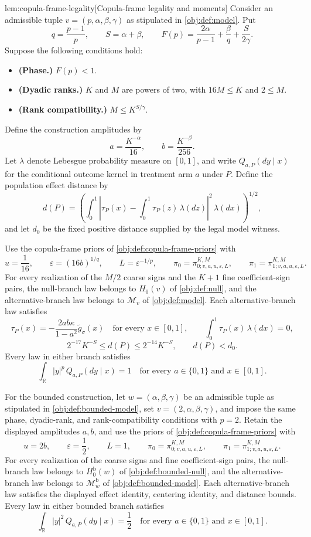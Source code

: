 \begin{lemmav}{lem:copula-frame-legality}[Copula-frame legality and moments]
Consider an admissible tuple \(v=(p,\alpha,\beta,\gamma)\) as stipulated in \cref{obj:def:model}. Put
\[
q=\frac{p-1}{p},\qquad S=\alpha+\beta,\qquad
F(p)=\frac{2\alpha}{p-1}+\frac{\beta}{q}+\frac{S}{2\gamma}.
\]
Suppose the following conditions hold:
\begin{itemize}
\item \textbf{(Phase.)} \(F(p)<1\).
\item \textbf{(Dyadic ranks.)} \(K\) and \(M\) are powers of two, with \(16M\le K\) and \(2\le M\).
\item \textbf{(Rank compatibility.)} \(M\le K^{S/\gamma}\).
\end{itemize}
Define the construction amplitudes by
\[
a=\frac{K^{-\alpha}}{16},\qquad b=\frac{K^{-\beta}}{256}.
\]
Let \(\lambda\) denote Lebesgue probability measure on \([0,1]\), and write \(Q_{a,P}(dy\mid x)\) for the conditional outcome kernel in treatment arm \(a\) under \(P\). Define the population effect distance by
\[
d(P)=
\left(
\int_0^1
\left|\tau_P(x)-\int_0^1\tau_P(z)\,\lambda(dz)\right|^2
\,\lambda(dx)
\right)^{1/2},
\]
and let \(d_0\) be the fixed positive distance supplied by the legal model witness.

Use the copula-frame priors of \cref{obj:def:copula-frame-priors} with
\[
u=\frac1{16},\qquad
\varepsilon=(16b)^{1/q},\qquad L=\varepsilon^{-1/p},
\qquad
\pi_0=\pi^{K,M}_{0;v,a,u,\varepsilon,L},\qquad
\pi_1=\pi^{K,M}_{1;v,a,u,\varepsilon,L}.
\]
For every realization of the \(M/2\) coarse signs and the \(K+1\) fine coefficient-sign pairs, the null-branch law belongs to \(H_0(v)\) of \cref{obj:def:null}, and the alternative-branch law belongs to \(\mathcal M_v\) of \cref{obj:def:model}. Each alternative-branch law satisfies
\[
\tau_P(x)=-\frac{2ab\kappa}{1-a^2}\widetilde g_\sigma(x)
\quad\text{for every }x\in[0,1],
\qquad
\int_0^1\tau_P(x)\,\lambda(dx)=0,
\]
\[
2^{-17}K^{-S}\le d(P)\le 2^{-14}K^{-S},
\qquad d(P)<d_0.
\]
Every law in either branch satisfies
\[
\int_{\mathbb R}|y|^p\,Q_{a,P}(dy\mid x)=1
\quad\text{for every }a\in\{0,1\}\text{ and }x\in[0,1].
\]

For the bounded construction, let \(w=(\alpha,\beta,\gamma)\) be an admissible tuple as stipulated in \cref{obj:def:bounded-model}, set \(v=(2,\alpha,\beta,\gamma)\), and impose the same phase, dyadic-rank, and rank-compatibility conditions with \(p=2\). Retain the displayed amplitudes \(a,b\), and use the priors of \cref{obj:def:copula-frame-priors} with
\[
u=2b,\qquad \varepsilon=\frac12,\qquad L=1,
\qquad
\pi_0=\pi^{K,M}_{0;v,a,u,\varepsilon,L},\qquad
\pi_1=\pi^{K,M}_{1;v,a,u,\varepsilon,L}.
\]
For every realization of the coarse signs and fine coefficient-sign pairs, the null-branch law belongs to \(H_0^{\mathrm b}(w)\) of \cref{obj:def:bounded-null}, and the alternative-branch law belongs to \(\mathcal M^{\mathrm b}_w\) of \cref{obj:def:bounded-model}. Each alternative-branch law satisfies the displayed effect identity, centering identity, and distance bounds. Every law in either bounded branch satisfies
\[
\int_{\mathbb R}|y|^2\,Q_{a,P}(dy\mid x)=\frac12
\quad\text{for every }a\in\{0,1\}\text{ and }x\in[0,1].
\]
\end{lemmav}

